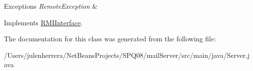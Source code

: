 \begin{DoxyExceptions}{Exceptions}
{\em Remote\+Exception} & \\
\hline
\end{DoxyExceptions}


Implements \hyperlink{interface_r_m_i_interface_a643b5963469fbc121032c7d75c01c7b9}{R\+M\+I\+Interface}.



The documentation for this class was generated from the following file\+:\begin{DoxyCompactItemize}
\item 
/\+Users/julenherrera/\+Net\+Beans\+Projects/\+S\+P\+Q08/mail\+Server/src/main/java/Server.\+java\end{DoxyCompactItemize}
